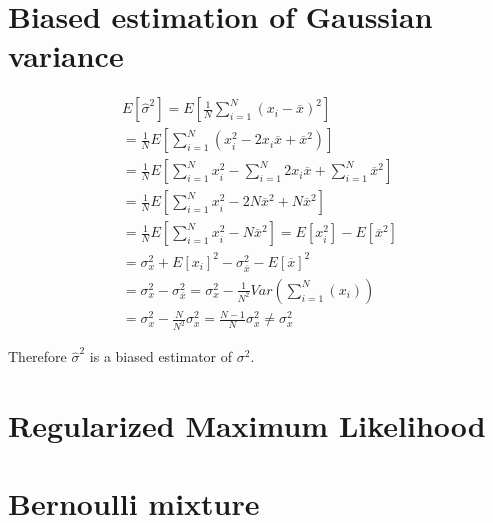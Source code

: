 \documentclass{article}
\begin{document}
\section{Biased estimation of Gaussian variance}

\begin{equation}
\begin{split}
E [ \hat { \sigma } ^ { 2 } ] = E [ \frac { 1 } { N } \sum _ { i = 1 } ^ { N } ( x _ { i } - \overline { x } ) ^ { 2 } ]  \\
= \frac { 1 } { N } E [ \sum _ { i = 1 } ^ { N } ( x _ { i } ^ { 2 } - 2 x _ { i } \overline { x } + \overline { x } ^ { 2 } ) ]  \\ 
= \frac { 1 } { N } E [ \sum _ {i = 1} ^ { N } x _ { i } ^ { 2 } - \sum _ {i = 1}^ { N } 2 x _ { i} \overline { x } + \sum_ {i = 1} ^ { N } \overline { x } ^ { 2 } ] \\
= \frac { 1 } { N } E [ \sum _ {i = 1} ^ { N } x _ { i } ^ { 2 } - 2N \overline { x }^{2} + N \overline { x } ^ { 2 } ] \\
= \frac { 1 } { N } E [ \sum _ {i = 1} ^ { N } x _ { i } ^ { 2 } - N \overline { x } ^ { 2 } ]  = E [  x _ { i } ^ { 2 } ]- E[\overline { x } ^ { 2 } ]  \\
= \sigma _ { x } ^ { 2 } + E [ x _ { i } ] ^ { 2 } - \sigma _ { \overline { x } } ^ { 2 } - E [ \overline { x }  ] ^ { 2 } \\
= \sigma _ { x } ^ { 2 } - \sigma _ { \overline x } ^ { 2 }  = \sigma _ { x } ^ { 2 } - \frac{1}{N^2}Var(\sum _ { i = 1 } ^ { N } ( x _ { i } )) \\ 
= \sigma _ { x } ^ { 2 } - \frac{N}{N^2}\sigma _ { x } ^ { 2 } =  \frac{N-1}{N}\sigma _ { x } ^ { 2 } \neq \sigma _ { x } ^ { 2 }
\end{split}
\end{equation}

Therefore  \(\hat { \sigma } ^ { 2 }\) is a biased estimator of \({ \sigma } ^ { 2 }\).


\section{Regularized Maximum Likelihood}


\section{Bernoulli mixture}
\end{document}
